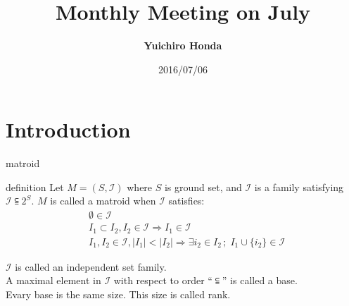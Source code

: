 \documentclass[11pt,xcolor=dvipsnames,table,dvipdfmx]{beamer}
\title{Monthly Meeting on July}
\author{\textbf{Yuichiro Honda}}
\date{2016/07/06}
\institute{Morita lab. M1}
\begin{document}
\maketitle

\section{Introduction}
\begin{frame}{matroid}
 \begin{block}{definition}
  Let $M = (S, \mathcal{I})$ where $S$ is ground set, and $\mathcal{I}$ is a family satisfying $\mathcal{I} \subseteqq 2^S$. $M$ is called a \alert{matroid} when $\mathcal{I}$ satisfies:
  \begin{align}
   &\emptyset \in \mathcal{I} \\
   &I_1 \subset I_2 , I_2 \in \mathcal{I} \Rightarrow I_1 \in \mathcal{I} \\
   &I_1 , I_2 \in \mathcal{I} , |I_1| < |I_2| \Rightarrow \exists i_2 \in I_2 \, ; \; I_1 \cup \{i_2\} \in \mathcal{I}
  \end{align}
 \end{block}
 $\mathcal{I}$ is called an \alert{independent set family}. \\
 A maximal element in $\mathcal{I}$ with respect to order ``$\subseteqq$'' is called a \alert{base}. \\
 Evary base is the same size. This size is called \alert{rank}.
\end{frame}
\end{document}
